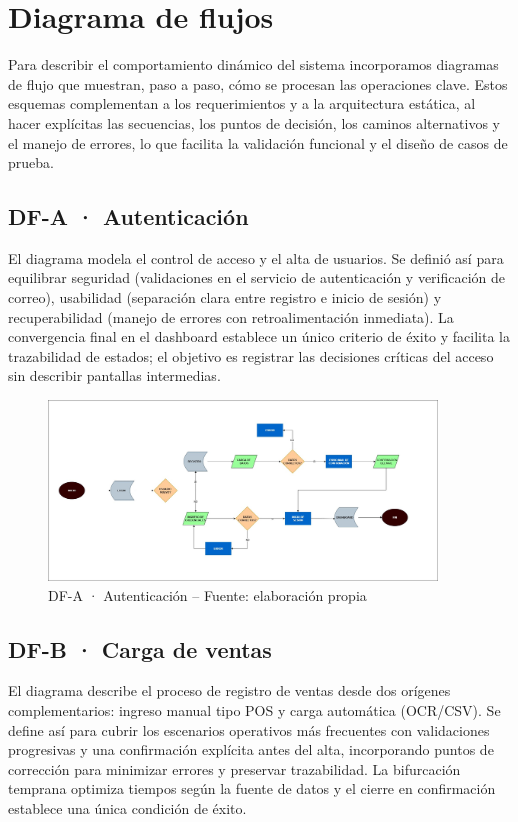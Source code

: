 \section{Diagrama de flujos}

Para describir el comportamiento dinámico del sistema incorporamos diagramas de flujo que muestran, paso a paso, cómo se procesan las operaciones clave. Estos esquemas complementan a los requerimientos y a la arquitectura estática, al hacer explícitas las secuencias, los puntos de decisión, los caminos alternativos y el manejo de errores, lo que facilita la validación funcional y el diseño de casos de prueba.
\vspace{1cm}


\subsection{DF-A · Autenticación}
El diagrama modela el control de acceso y el alta de usuarios. Se definió así para equilibrar seguridad (validaciones en el servicio de autenticación y verificación de correo), usabilidad (separación clara entre registro e inicio de sesión) y recuperabilidad (manejo de errores con retroalimentación inmediata). La convergencia final en el dashboard establece un único criterio de éxito y facilita la trazabilidad de estados; el objetivo es registrar las decisiones críticas del acceso sin describir pantallas intermedias.

\begin{figure}[!htbp]
  \centering
  \includegraphics[width=0.92\textwidth]{images/FlujoAutenticacion.jpg}
  \caption{DF-A · Autenticación -- Fuente: elaboración propia}
  \label{fig:df-a-autenticacion}
\end{figure}


\subsection{DF-B · Carga de ventas}
El diagrama describe el proceso de registro de ventas desde dos orígenes complementarios: ingreso manual tipo POS y carga automática (OCR/CSV). Se define así para cubrir los escenarios operativos más frecuentes con validaciones progresivas y una confirmación explícita antes del alta, incorporando puntos de corrección para minimizar errores y preservar trazabilidad. La bifurcación temprana optimiza tiempos según la fuente de datos y el cierre en confirmación establece una única condición de éxito.

